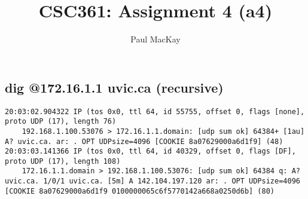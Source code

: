 \documentclass{article}
\title{CSC361: Assignment 4 (a4)}
\author{Paul MacKay}
\begin{document}
\maketitle


\section{}
\subsection{dig @172.16.1.1 uvic.ca (recursive)}
{\scriptsize
\begin{lstlisting}
20:03:02.904322 IP (tos 0x0, ttl 64, id 55755, offset 0, flags [none], proto UDP (17), length 76)
    192.168.1.100.53076 > 172.16.1.1.domain: [udp sum ok] 64384+ [1au] A? uvic.ca. ar: . OPT UDPsize=4096 [COOKIE 8a07629000a6d1f9] (48)
20:03:03.141366 IP (tos 0x0, ttl 64, id 40329, offset 0, flags [DF], proto UDP (17), length 108)
    172.16.1.1.domain > 192.168.1.100.53076: [udp sum ok] 64384 q: A? uvic.ca. 1/0/1 uvic.ca. [5m] A 142.104.197.120 ar: . OPT UDPsize=4096 [COOKIE 8a07629000a6d1f9 0100000065c6f5770142a668a0250d6b] (80)
\end{lstlisting}
}
\end{document}
